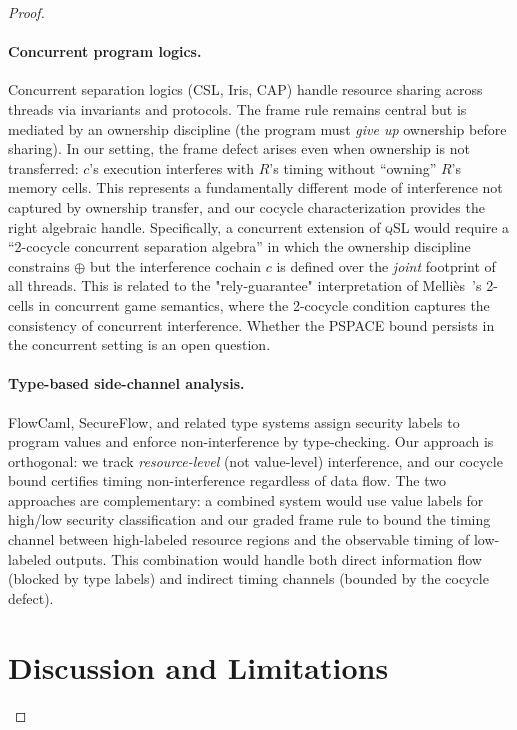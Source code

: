 \documentclass[acmsmall,sigplan,anonymous,review,screen]{acmart}
\theoremstyle{plain}
\theoremstyle{definition}
\newcommand{\qSL}{\textsc{qSL}\xspace}
\begin{document}
\begin{proof}
\paragraph{Concurrent program logics.}
Concurrent separation logics (CSL, Iris, CAP) handle resource sharing
across threads via invariants and protocols.  The frame rule remains central
but is mediated by an ownership discipline (the program must \emph{give up}
ownership before sharing).  In our setting, the frame defect arises even when
ownership is not transferred: $c$'s execution interferes with $R$'s timing
without ``owning'' $R$'s memory cells.  This represents a fundamentally
different mode of interference not captured by ownership transfer, and our
cocycle characterization provides the right algebraic handle.  Specifically,
a concurrent extension of \qSL would require a ``2-cocycle concurrent
separation algebra'' in which the ownership discipline constrains $\oplus$
but the interference cochain $c$ is defined over the \emph{joint} footprint
of all threads.  This is related to the "rely-guarantee" interpretation of
Melli\`es~\cite{mellies2009categorical}'s 2-cells in concurrent game semantics,
where the 2-cocycle condition captures the consistency of concurrent interference.
Whether the PSPACE bound persists in the concurrent setting is an open question.

\paragraph{Type-based side-channel analysis.}
FlowCaml, SecureFlow, and related type systems assign security labels to
program values and enforce non-interference by type-checking.  Our approach
is orthogonal: we track \emph{resource-level} (not value-level) interference,
and our cocycle bound certifies timing non-interference regardless of data
flow.  The two approaches are complementary: a combined system would use
value labels for high/low security classification and our graded frame rule
to bound the timing channel between high-labeled resource regions and
the observable timing of low-labeled outputs.  This combination would
handle both direct information flow (blocked by type labels) and indirect
timing channels (bounded by the cocycle defect).

\section{Discussion and Limitations}
\label{sec:discussion}


\end{proof}
\end{document}
